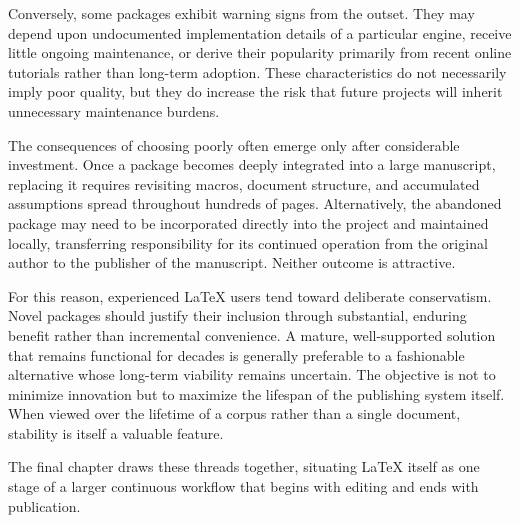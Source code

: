 Conversely, some packages exhibit warning signs from the outset. They may depend upon undocumented implementation details of a particular engine, receive little ongoing maintenance, or derive their popularity primarily from recent online tutorials rather than long-term adoption. These characteristics do not necessarily imply poor quality, but they do increase the risk that future projects will inherit unnecessary maintenance burdens.

The consequences of choosing poorly often emerge only after considerable investment. Once a package becomes deeply integrated into a large manuscript, replacing it requires revisiting macros, document structure, and accumulated assumptions spread throughout hundreds of pages. Alternatively, the abandoned package may need to be incorporated directly into the project and maintained locally, transferring responsibility for its continued operation from the original author to the publisher of the manuscript. Neither outcome is attractive.

For this reason, experienced LaTeX users tend toward deliberate conservatism. Novel packages should justify their inclusion through substantial, enduring benefit rather than incremental convenience. A mature, well-supported solution that remains functional for decades is generally preferable to a fashionable alternative whose long-term viability remains uncertain. The objective is not to minimize innovation but to maximize the lifespan of the publishing system itself. When viewed over the lifetime of a corpus rather than a single document, stability is itself a valuable feature.

The final chapter draws these threads together, situating LaTeX itself as one stage of a larger continuous workflow that begins with editing and ends with publication.
